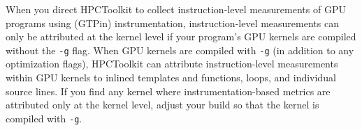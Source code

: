 When you direct HPCToolkit to collect instruction-level measurements of GPU programs using (GTPin) instrumentation, instruction-level measurements can only be attributed at the kernel level
if your program's GPU kernels are compiled without the {\tt -g} flag. When GPU kernels are compiled with {\tt -g} (in addition to any optimization flags), HPCToolkit can attribute instruction-level measurements within GPU kernels to inlined templates and functions, loops, and individual source lines. If you find any kernel where instrumentation-based metrics are attributed only at the kernel level, adjust your build so that the kernel is compiled with {\tt -g}.

